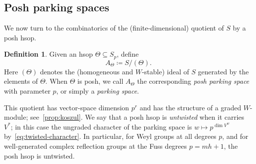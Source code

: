 \documentclass[11pt]{amsart}
\newcommand{\defeq}{\coloneqq}
\newcommand{\defn}[1]{\emph{\color{darkblue}#1}}
\theoremstyle{definition}
\newtheorem{definition}[theorem]{Definition}
\newcommand{\nathan}[1]{\todo[size=\tiny,color=green!30]{#1 \\ \hfill --- N.}}
\newcommand{\Nathan}[1]{\todo[size=\tiny,inline,color=green!30]{#1
      \\ \hfill --- N.}}
\begin{document}


%




\subsection{Posh parking spaces}
We now turn to the combinatorics of the (finite-dimensional) quotient of $S$ by a posh hsop.
\begin{definition}
Given an hsop $\Theta\subseteq S_p$, define
\[
 A_\Theta\defeq S/(\Theta).
\]
Here $(\Theta)$ denotes the (homogeneous and $W$-stable) ideal of $S$ generated by the elements
of $\Theta$.  %
When $\Theta$ is posh, we call $A_\Theta$ the corresponding
\defn{posh parking space} with parameter $p$, or simply a \defn{parking space}.
\label{def:parking_space}
\end{definition}
This quotient has vector-space dimension $p^r$ and has the
structure of a graded $W$-module; see~\cref{prop:koszul}.
We say that a posh hsop is \defn{untwisted} when it
carries $V^*$; in this case the ungraded character of the parking space is
$w\mapsto p^{\dim V^w}$ by~\cref{eq:twisted-character}.  In particular, for Weyl groups at all degrees $p$, and for well-generated complex reflection groups at the Fuss degrees $p=mh+1$, the posh hsop is untwisted.
\end{document}
